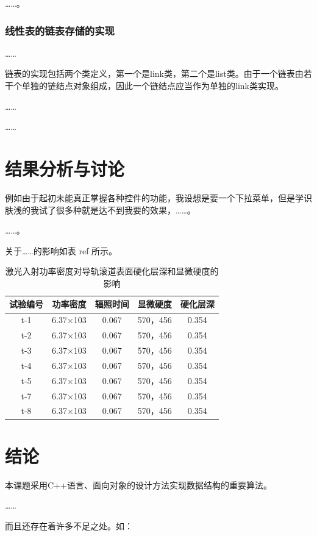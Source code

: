 \documentclass{upcthesis}
\begin{document}
……。

\subsubsection{线性表的链表存储的实现}
……

链表的实现包括两个类定义，第一个是link类，第二个是list类。由于一个链表由若干个单独的链结点对象组成，因此一个链结点应当作为单独的link类实现。

……

……

\section{结果分析与讨论}
例如由于起初未能真正掌握各种控件的功能，我设想是要一个下拉菜单，但是学识肤浅的我试了很多种就是达不到我要的效果，……。

……。

关于……的影响如表 {ref} 所示。

\begin{table}
	\centering
	\caption{激光入射功率密度对导轨滚道表面硬化层深和显微硬度的影响}
	\begin{tabular}{ccccc}
		\toprule
		试验编号 	& 功率密度 & 辐照时间 & 显微硬度 	& 硬化层深 \\ \midrule
		t-1			&	6.37×103&	0.067	&	570，456	& 	0.354\\
		t-2			&	6.37×103&	0.067 &	570，456 &	0.354\\
		t-3			&	6.37×103&	0.067 &	570，456 &	0.354\\
		t-4			&	6.37×103&	0.067 &	570，456 &	0.354\\
		t-5			&	6.37×103&	0.067 &	570，456 &	0.354\\
		t-7			&	6.37×103&	0.067 &	570，456 &	0.354\\
		t-8			&	6.37×103&	0.067 &	570，456 &	0.354\\ \bottomrule
	\end{tabular}
	\label{tab:tab1}
\end{table} 

\section{结论}
	本课题采用C++语言、面向对象的设计方法实现数据结构的重要算法。
	
	……

	而且还存在着许多不足之处。如：

	
\end{document}
